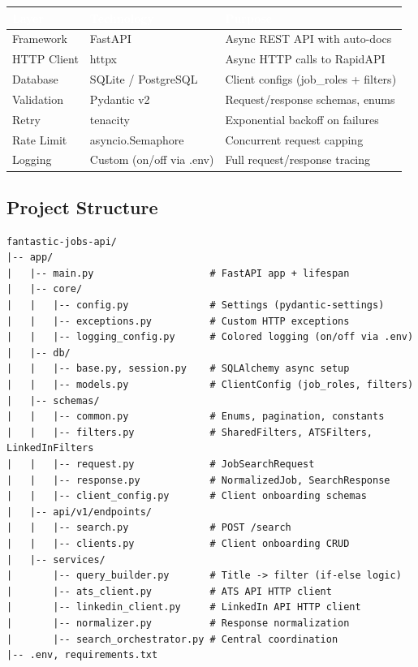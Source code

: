 \documentclass[11pt, a4paper]{article}
\begin{document}
\begin{center}\small
\begin{tabularx}{\textwidth}{|L{2.8cm}|L{3.5cm}|X|}
\hline
{}
\textcolor{white}{\textbf{Layer}} & \textcolor{white}{\textbf{Technology}} & \textcolor{white}{\textbf{Purpose}} \\
\hline
Framework & FastAPI & Async REST API with auto-docs \\
HTTP Client & httpx & Async HTTP calls to RapidAPI \\
Database & SQLite / PostgreSQL & Client configs (job\_roles + filters) \\
Validation & Pydantic v2 & Request/response schemas, enums \\
Retry & tenacity & Exponential backoff on failures \\
Rate Limit & asyncio.Semaphore & Concurrent request capping \\
Logging & Custom (on/off via .env) & Full request/response tracing \\
\hline
\end{tabularx}
\end{center}

\subsection{Project Structure}

\begin{lstlisting}[style=apistyle]
fantastic-jobs-api/
|-- app/
|   |-- main.py                    # FastAPI app + lifespan
|   |-- core/
|   |   |-- config.py              # Settings (pydantic-settings)
|   |   |-- exceptions.py          # Custom HTTP exceptions
|   |   |-- logging_config.py      # Colored logging (on/off via .env)
|   |-- db/
|   |   |-- base.py, session.py    # SQLAlchemy async setup
|   |   |-- models.py              # ClientConfig (job_roles, filters)
|   |-- schemas/
|   |   |-- common.py              # Enums, pagination, constants
|   |   |-- filters.py             # SharedFilters, ATSFilters, LinkedInFilters
|   |   |-- request.py             # JobSearchRequest
|   |   |-- response.py            # NormalizedJob, SearchResponse
|   |   |-- client_config.py       # Client onboarding schemas
|   |-- api/v1/endpoints/
|   |   |-- search.py              # POST /search
|   |   |-- clients.py             # Client onboarding CRUD
|   |-- services/
|       |-- query_builder.py       # Title -> filter (if-else logic)
|       |-- ats_client.py          # ATS API HTTP client
|       |-- linkedin_client.py     # LinkedIn API HTTP client
|       |-- normalizer.py          # Response normalization
|       |-- search_orchestrator.py # Central coordination
|-- .env, requirements.txt
\end{lstlisting}
\end{document}
